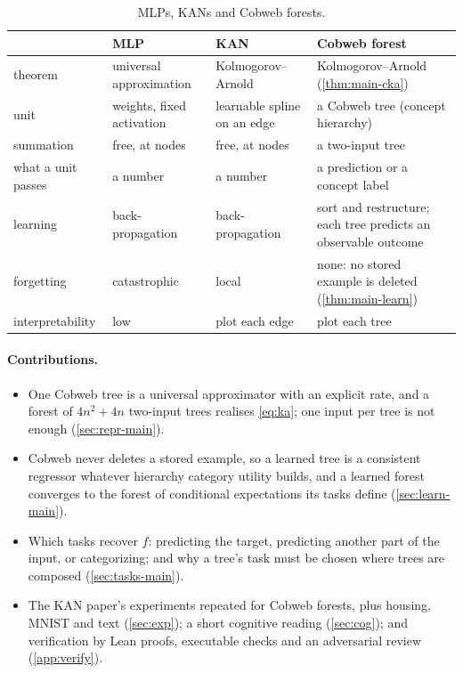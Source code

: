 \documentclass[11pt]{article}
\theoremstyle{definition}
\theoremstyle{remark}
\begin{document}
\begin{table}[t]
\centering\small
\begin{tabular}{@{}p{3.1cm}p{3.3cm}p{3.6cm}p{4.6cm}@{}}\toprule
 & MLP & KAN & Cobweb forest\\\midrule
theorem & universal approximation & Kolmogorov--Arnold & Kolmogorov--Arnold (\cref{thm:main-cka})\\
unit & weights, fixed activation & learnable spline on an edge & a Cobweb tree (concept hierarchy)\\
summation & free, at nodes & free, at nodes & a two-input tree\\
what a unit passes & a number & a number & a prediction or a concept label\\
learning & back-propagation & back-propagation & sort and restructure; each tree predicts an observable outcome\\
forgetting & catastrophic & local & none: no stored example is deleted (\cref{thm:main-learn})\\
interpretability & low & plot each edge & plot each tree\\
\bottomrule
\end{tabular}
\caption{MLPs, KANs and Cobweb forests.}
\label{tab:analogy}
\end{table}

\paragraph{Contributions.}
\begin{itemize}[leftmargin=*,noitemsep]
\item One Cobweb tree is a universal approximator with an explicit rate, and a forest of
  $4n^2+4n$ two-input trees realises \eqref{eq:ka}; one input per tree is not enough
  (\cref{sec:repr-main}).
\item Cobweb never deletes a stored example, so a learned tree is a consistent regressor
  whatever hierarchy category utility builds, and a learned forest converges to the forest
  of conditional expectations its tasks define (\cref{sec:learn-main}).
\item Which tasks recover $f$: predicting the target, predicting another part of the
  input, or categorizing; and why a tree's task must be chosen where trees are composed
  (\cref{sec:tasks-main}).
\item The KAN paper's experiments repeated for Cobweb forests, plus housing, MNIST and
  text (\cref{sec:exp}); a short cognitive reading (\cref{sec:cog}); and verification by
  Lean proofs, executable checks and an adversarial review (\cref{app:verify}).
\end{itemize}
\end{document}
